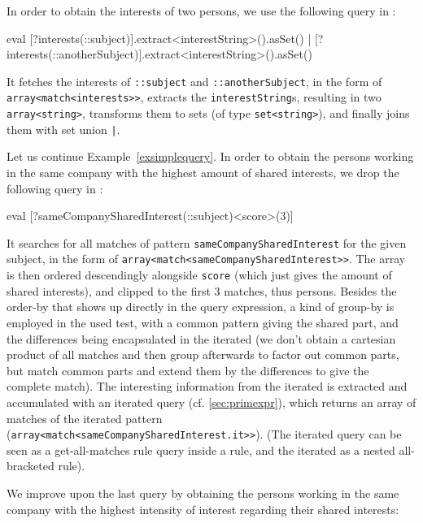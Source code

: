 \begin{example}
In order to obtain the interests of two persons, we use the following query in \GrShell:

	\begin{grshell}
eval [?interests(::subject)].extract<interestString>().asSet() | [?interests(::anotherSubject)].extract<interestString>().asSet()
  \end{grshell}
	
It fetches the interests of \texttt{::subject} and \texttt{::anotherSubject}, in the form of \texttt{array<match<interests>>}, extracts the \texttt{interestString}s, resulting in two \texttt{array<string>}, transforms them to sets (of type \texttt{set<string>}), and finally joins them with set union \texttt{|}.

\end{example}


\begin{example}
Let us continue Example~\ref{exsimplequery}. In order to obtain the persons working in the same company with the highest amount of shared interests, we drop the following query in \GrShell:

  \begin{grshell}
eval [?sameCompanySharedInterest(::subject)\orderDescendingBy<score>\keepFirst(3)]
  \end{grshell}

It searches for all matches of pattern \texttt{sameCompanySharedInterest} for the given subject, in the form of \texttt{array<match<sameCompanySharedInterest>>}.
The array is then ordered descendingly alongside \texttt{score} (which just gives the amount of shared interests), and clipped to the first 3 matches, thus persons.
Besides the order-by that shows up directly in the query expression, a kind of group-by is employed in the used test, with a common pattern giving the shared part, and the differences being encapsulated in the iterated (we don't obtain a cartesian product of all matches and then group afterwards to factor out common parts, but match common parts and extend them by the differences to give the complete match).
The interesting information from the iterated is extracted and accumulated with an iterated query (cf. \ref{sec:primexpr}), which returns an array of matches of the iterated pattern (\texttt{array<match<sameCompanySharedInterest.it>>}).
(The iterated query can be seen as a get-all-matches rule query inside a rule, and the iterated as a nested all-bracketed rule).

We improve upon the last query by obtaining the persons working in the same company with the highest intensity of interest regarding their shared interests:


\end{example}
